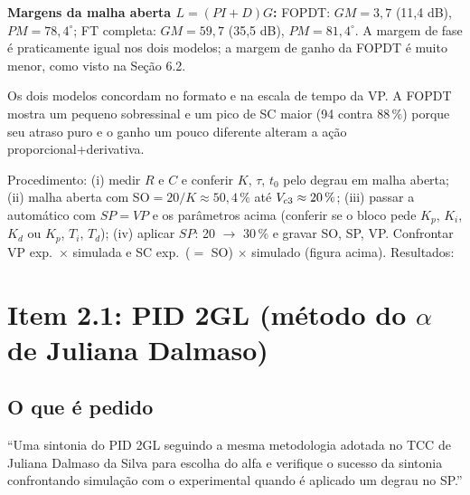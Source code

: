 \textbf{Margens da malha aberta $L=(PI+D)G$:} FOPDT: $GM=3{,}7$ (11,4 dB), $PM=78{,}4^\circ$; FT completa: $GM=59{,}7$ (35,5 dB), $PM=81{,}4^\circ$. A margem de fase é praticamente igual nos dois modelos; a margem de ganho da FOPDT é muito menor, como visto na Seção 6.2.
\begin{just}Os dois modelos concordam no formato e na escala de tempo da VP. A FOPDT mostra um pequeno sobressinal e um pico de SC maior (94 contra 88\,\%) porque seu atraso puro e o ganho um pouco diferente alteram a ação proporcional+derivativa.\end{just}
\begin{todo}Procedimento: (i) medir $R$ e $C$ e conferir $K$, $\tau$, $t_0$ pelo degrau em malha aberta; (ii) malha aberta com SO$=20/K\approx50{,}4\,\%$ até $V_{c3}\approx20\,\%$; (iii) passar a automático com $SP=VP$ e os parâmetros acima (conferir se o bloco pede $K_p$, $K_i$, $K_d$ ou $K_p$, $T_i$, $T_d$); (iv) aplicar $SP$: 20 $\to$ 30\,\% e gravar SO, SP, VP. Confrontar VP exp.\ $\times$ simulada e SC exp.\ ($=$ SO) $\times$ simulado (figura acima). Resultados: \underline{\hspace{6cm}}\end{todo}

\section{Item 2.1: PID 2GL (método do $\alpha$ de Juliana Dalmaso)}
\subsection{O que é pedido}
``Uma sintonia do PID 2GL seguindo a mesma metodologia adotada no TCC de Juliana Dalmaso da Silva para escolha do alfa e verifique o sucesso da sintonia confrontando simulação com o experimental quando é aplicado um degrau no SP.''

